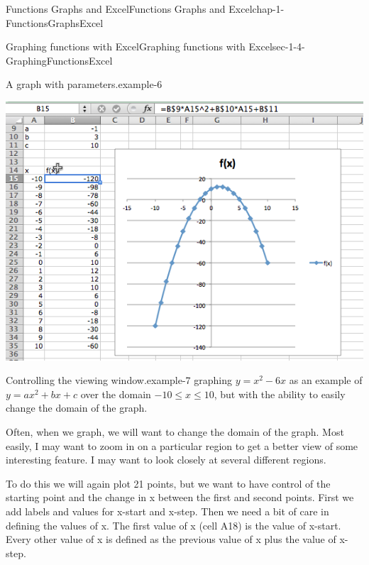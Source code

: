 \documentclass[oneside,10pt,]{book}
\numberwithin{equation}{section}
\begin{document}
\begin{chapterptx}{Functions Graphs and Excel}{}{Functions Graphs and Excel}{}{}{chap-1-FunctionsGraphsExcel}
\begin{sectionptx}{Graphing functions with Excel}{}{Graphing functions with Excel}{}{}{sec-1-4-GraphingFunctionsExcel}
\begin{example}{A graph with parameters.}{example-6}
\begin{sidebyside}{1}{0.1}{0.1}{0}
\begin{sbspanel}{0.8}
\includegraphics[width=1\linewidth]{images/sec1-4-7.png}
\end{sbspanel}%
\end{sidebyside}%
\end{example}
\begin{example}{Controlling the viewing window.}{example-7}%
\hypertarget{p-327}{}%
graphing \(y=x^2 - 6 x\) as an example of \(y = a x^2 + b x + c\) over the domain \(-10 \le x \le 10\), but with the ability to easily change the domain of the graph.%
\par
\hypertarget{p-328}{}%
Often, when we graph, we will want to change the domain of the graph.  Most easily, I may want to zoom in on a particular region to get a better view of some interesting feature.  I may want to look closely at several different regions.%
\par
\hypertarget{p-329}{}%
To do this we will again plot 21 points, but we want to have control of the starting point and the change in x between the first and second points.  First we add labels and values for x-start and x-step.  Then we need a bit of care in defining the values of x.  The first value of x (cell A18) is the value of x-start.  Every other value of x is defined as the previous value of x plus the value of x-step.%
\begin{sidebyside}{1}{0.1}{0.1}{0}%
\begin{sbspanel}{0.8}%

\end{sbspanel}
\end{sidebyside}
\end{example}
\end{sectionptx}
\end{chapterptx}
\end{document}
